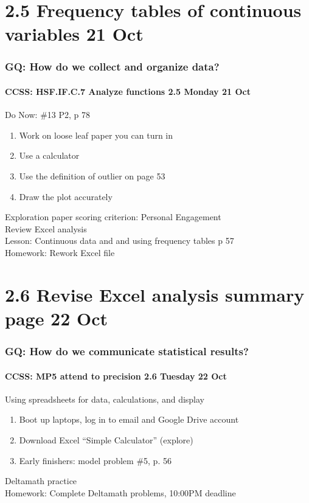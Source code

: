 \documentclass{beamer}
\begin{document}
  \section{2.5 Frequency tables of continuous variables 21 Oct}
  \frame
  {
    \frametitle{GQ: How do we collect and organize data?}
    \framesubtitle{CCSS: HSF.IF.C.7 Analyze functions \hfill \alert{2.5 Monday 21 Oct}}

    \begin{block}{Do Now: \#13 P2, p 78}
    \begin{enumerate}
        \item Work on loose leaf paper you can turn in
        \item Use a calculator
        \item Use the definition of outlier on page 53
        \item Draw the plot accurately
    \end{enumerate}
    \end{block}
    Exploration paper scoring criterion: Personal Engagement \\
    Review Excel analysis \\
    Lesson: Continuous data and and using frequency tables p 57\\ \smallskip
    Homework: Rework Excel file
  }

  \section{2.6 Revise Excel analysis summary page 22 Oct}
  \frame
  {
    \frametitle{GQ: How do we communicate statistical results?}
    \framesubtitle{CCSS: MP5 attend to precision \hfill \alert{2.6 Tuesday 22 Oct}}

    \begin{block}{Using spreadsheets for data, calculations, and display}
      \begin{enumerate}
        \item Boot up laptops, log in to email and Google Drive account
        \item Download Excel ``Simple Calculator'' (explore)
        \item Early finishers: model problem \#5, p. 56
    \end{enumerate}
    \end{block}
    Deltamath practice\\ \smallskip
    Homework: Complete Deltamath problems, 10:00PM deadline
  }
\end{document}
